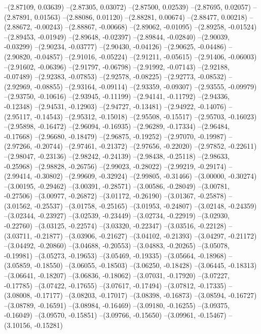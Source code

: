 --(2.87109, 0.03639)
--(2.87305, 0.03072)
--(2.87500, 0.02539)
--(2.87695, 0.02057)
--(2.87891, 0.01563)
--(2.88086, 0.01120)
--(2.88281, 0.00674)
--(2.88477, 0.00218)
--(2.88672, -0.00243)
--(2.88867, -0.00668)
--(2.89062, -0.01095)
--(2.89258, -0.01524)
--(2.89453, -0.01949)
--(2.89648, -0.02397)
--(2.89844, -0.02840)
--(2.90039, -0.03299)
--(2.90234, -0.03777)
--(2.90430, -0.04126)
--(2.90625, -0.04486)
--(2.90820, -0.04857)
--(2.91016, -0.05224)
--(2.91211, -0.05615)
--(2.91406, -0.06003)
--(2.91602, -0.06396)
--(2.91797, -0.06798)
--(2.91992, -0.07143)
--(2.92188, -0.07489)
--(2.92383, -0.07853)
--(2.92578, -0.08225)
--(2.92773, -0.08532)
--(2.92969, -0.08855)
--(2.93164, -0.09114)
--(2.93359, -0.09307)
--(2.93555, -0.09979)
--(2.93750, -0.10616)
--(2.93945, -0.11199)
--(2.94141, -0.11792)
--(2.94336, -0.12348)
--(2.94531, -0.12903)
--(2.94727, -0.13481)
--(2.94922, -0.14076)
--(2.95117, -0.14543)
--(2.95312, -0.15018)
--(2.95508, -0.15517)
--(2.95703, -0.16023)
--(2.95898, -0.16472)
--(2.96094, -0.16935)
--(2.96289, -0.17334)
--(2.96484, -0.17668)
--(2.96680, -0.18479)
--(2.96875, -0.19252)
--(2.97070, -0.19987)
--(2.97266, -0.20744)
--(2.97461, -0.21372)
--(2.97656, -0.22020)
--(2.97852, -0.22611)
--(2.98047, -0.23136)
--(2.98242, -0.24139)
--(2.98438, -0.25118)
--(2.98633, -0.25968)
--(2.98828, -0.26756)
--(2.99023, -0.28022)
--(2.99219, -0.29174)
--(2.99414, -0.30802)
--(2.99609, -0.32924)
--(2.99805, -0.31466)
--(3.00000, -0.30274)
--(3.00195, -0.29462)
--(3.00391, -0.28571)
--(3.00586, -0.28049)
--(3.00781, -0.27506)
--(3.00977, -0.26872)
--(3.01172, -0.26190)
--(3.01367, -0.25878)
--(3.01562, -0.25537)
--(3.01758, -0.25165)
--(3.01953, -0.24807)
--(3.02148, -0.24359)
--(3.02344, -0.23927)
--(3.02539, -0.23449)
--(3.02734, -0.22919)
--(3.02930, -0.22760)
--(3.03125, -0.22574)
--(3.03320, -0.22347)
--(3.03516, -0.22128)
--(3.03711, -0.21877)
--(3.03906, -0.21627)
--(3.04102, -0.21393)
--(3.04297, -0.21172)
--(3.04492, -0.20860)
--(3.04688, -0.20553)
--(3.04883, -0.20265)
--(3.05078, -0.19981)
--(3.05273, -0.19653)
--(3.05469, -0.19335)
--(3.05664, -0.18968)
--(3.05859, -0.18550)
--(3.06055, -0.18503)
--(3.06250, -0.18428)
--(3.06445, -0.18313)
--(3.06641, -0.18207)
--(3.06836, -0.18062)
--(3.07031, -0.17920)
--(3.07227, -0.17785)
--(3.07422, -0.17655)
--(3.07617, -0.17494)
--(3.07812, -0.17335)
--(3.08008, -0.17177)
--(3.08203, -0.17017)
--(3.08398, -0.16873)
--(3.08594, -0.16727)
--(3.08789, -0.16591)
--(3.08984, -0.16469)
--(3.09180, -0.16255)
--(3.09375, -0.16049)
--(3.09570, -0.15851)
--(3.09766, -0.15650)
--(3.09961, -0.15467)
--(3.10156, -0.15281)
